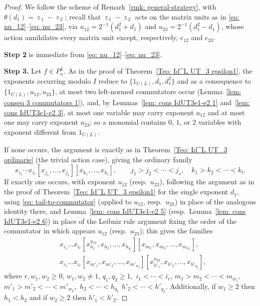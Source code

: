 \documentclass[a4paper,reqno]{amsart}
\theoremstyle{definition}
\numberwithin{equation}{section}
\numberwithin{theorem}{section}
\DeclareMathOperator{\e}{\varepsilon}
\begin{document}
\begin{proof}
We follow the scheme of Remark~\ref{rmk: general-strategy}, with $\theta(d_1)=\e_1-\e_2$; recall
that $\e_1-\e_2$ acts on the matrix units as in \eqref{eq: nu_12}--\eqref{eq: nu_23}, via
$u_{12}=2^{-1}(d_1^2+d_1)$ and $u_{23}=2^{-1}(d_1^2-d_1)$, whose action annihilates every matrix
unit except, respectively, $e_{12}$ and $e_{23}$.

\textbf{Step 2} is immediate from \eqref{eq: nu_12}--\eqref{eq: nu_23}.

\textbf{Step 3.} Let $f\in P_n^L$. As in the proof of Theorem~\ref{Teo: Id^L UT_3 epsilon1}, the exponents occurring
modulo $I$ reduce to $\{1_{U(L)}, d_1, d_1^2\}$ and as a consequence to $\{1_{U(L)},u_{12},u_{23}\}$, at most two left-normed commutators occur
(Lemma~\ref{lem: conseq 3 commutators 1}), and, by Lemmas~\ref{lem: cons IdUT3e1-e2 1}
and~\ref{lem: cons IdUT3e1-e2 3}, at most one variable may carry exponent $u_{12}$ and at most one
may carry exponent $u_{23}$; so a monomial contains $0$, $1$, or $2$ variables with exponent
different from $1_{U(L)}$.

If none occurs, the argument is exactly as in Theorem~\ref{Teo: Id^L UT_3 ordinarie} (the trivial
action case), giving the ordinary family
$$
x_{i_1}\cdots x_{i_r}[x_{j_1},\ldots,x_{j_s}][x_{k_1},\ldots,x_{k_t}], \qquad
j_1>j_2<\cdots<j_s, \quad k_1>k_2<\cdots<k_t.
$$
If exactly one occurs, with exponent $u_{12}$ (resp.\
$u_{23}$), following the argument as in the proof of Theorem~\ref{Teo: Id^L UT_3 epsilon1} for the
single exponent $d_1$, using \eqref{eq: tail-to-commutator} (applied to $u_{12}$, resp.\ $u_{23}$) in
place of the analogous identity there, and Lemma~\ref{lem: cons IdUT3e1-e2 5} (resp.\
Lemma~\ref{lem: cons IdUT3e1-e2 6})  in place of the Leibniz rule argument fixing the order of the commutator in which appears $u_{12}$ (resp.\ $u_{23}$); this gives the families 
\begin{align*}
&x_{i_{1}}\dots x_{i_{r}}[x_{h_1}^{u_{12}},x_{h_2},\dots,x_{h_{q_1}}][x_{m_1},x_{m_2},\dots,x_{m_{w_1}}],\\ 
&x_{i_{1}}\dots x_{i_{r}}[x_{m'_1},x_{m'_2},\dots,x_{m'_{w_2}}][x_{h'_1}^{u_{23}},x_{h'_2},\dots,x_{h'_{q_2}}],
\end{align*}
where $r,w_1,w_2\geq 0$,  $w_1,w_2\neq 1$, $ q_1,q_2\geq 1,$  $i_1<\cdots < i_r$, $m_1>m_2< \cdots < m_{w_1},$  $m'_1>m'_2< \cdots < m'_{w_2},$  $h_2< \cdots <h_{q_1}$  $h'_2< \cdots <h'_{q_2}.$ Additionally,  if $w_1\geq 2$  then $h_1<h_2$   and if $w_2\geq 2$  then $h'_1<h'_2.$
    


\end{proof}
\end{document}
